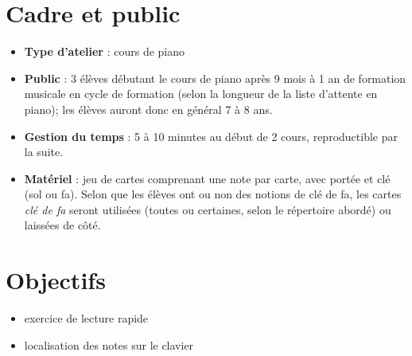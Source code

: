 \documentclass[a4paper,11pt,bibliography=totoc,numbers=noenddot,listof=flat,DIV=11,BCOR=0mm]{scrreprt}%
\begin{document}
\section*{Cadre et public}
\begin{itemize}
\item [\textbullet]\textbf{Type d'atelier} : cours de piano

\item [\textbullet]\textbf{Public} : 3 élèves débutant le cours de piano après 9 mois à 1 an de formation musicale en cycle de formation (selon la longueur de la liste d'attente en piano); les élèves auront donc en général 7 à 8 ans.

\item [\textbullet]\textbf{Gestion du temps} : 5 à 10 minutes au début de 2\ieme{} cours, reproductible par la suite.

\item [\textbullet]\textbf{Matériel} : jeu de cartes comprenant une note par carte, avec portée et clé (sol ou fa). Selon que les élèves ont ou non des notions de clé de fa, les cartes \emph{clé de fa} seront utilisées (toutes ou certaines, selon le répertoire abordé) ou laissées de côté.
\end{itemize}

\begin{figure}[ht!]
\centerline
   {}
\end{figure}








\section*{Objectifs}
\begin{itemize}
\item exercice de lecture rapide
\item localisation des notes sur le clavier
\end{itemize}
\end{document}
